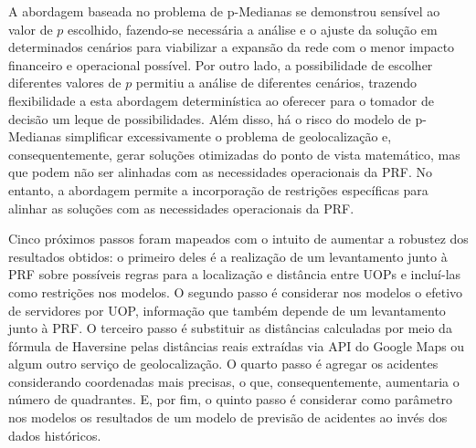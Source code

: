 A abordagem baseada no problema de p-Medianas se demonstrou sensível ao valor de $p$ escolhido, fazendo-se necessária a análise e o ajuste da solução em determinados cenários para viabilizar a expansão da rede com o menor impacto financeiro e operacional possível. Por outro lado, a possibilidade de escolher diferentes valores de $p$ permitiu a análise de diferentes cenários, trazendo flexibilidade a esta abordagem determinística ao oferecer para o tomador de decisão um leque de possibilidades. Além disso, há o risco do modelo de p-Medianas simplificar excessivamente o problema de geolocalização e, consequentemente, gerar soluções otimizadas do ponto de vista matemático, mas que podem não ser alinhadas com as necessidades operacionais da PRF. No entanto, a abordagem permite a incorporação de restrições específicas para alinhar as soluções com as necessidades operacionais da PRF.

Cinco próximos passos foram mapeados com o intuito de aumentar a robustez dos resultados obtidos: o primeiro deles é a realização de um levantamento junto à PRF sobre possíveis regras para a localização e distância entre UOPs e incluí-las como restrições nos modelos. O segundo passo é considerar nos modelos o efetivo de servidores por UOP, informação que também depende de um levantamento junto à PRF. O terceiro passo é substituir as distâncias calculadas por meio da fórmula de Haversine pelas distâncias reais extraídas via API do Google Maps ou algum outro serviço de geolocalização. O quarto passo é agregar os acidentes considerando coordenadas mais precisas, o que, consequentemente, aumentaria o número de quadrantes. E, por fim, o quinto passo é considerar como parâmetro nos modelos os resultados de um modelo de previsão de acidentes ao invés dos dados históricos.


